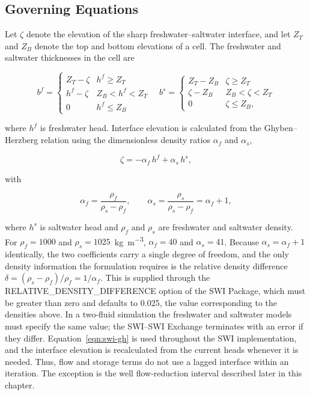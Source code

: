 \subsection{Governing Equations}

Let $\zeta$ denote the elevation of the sharp freshwater--saltwater interface, and let $Z_{T}$ and $Z_{B}$ denote the top and bottom elevations of a cell. The freshwater and saltwater thicknesses in the cell are

\begin{equation}
\label{eqn:swi-thick}
b^{f}=
\begin{cases}
Z_{T}-\zeta & h^{f}\ge Z_{T}\\
h^{f}-\zeta & Z_{B}<h^{f}<Z_{T}\\
0 & h^{f}\le Z_{B}
\end{cases}
\quad
b^{s}=
\begin{cases}
Z_{T}-Z_{B} & \zeta\ge Z_{T}\\
\zeta-Z_{B} & Z_{B}<\zeta<Z_{T}\\
0 & \zeta\le Z_{B},
\end{cases}
\end{equation}

\noindent where $h^{f}$ is freshwater head. Interface elevation is calculated from the Ghyben--Herzberg relation using the dimensionless density ratios $\alpha_{f}$ and $\alpha_{s}$,

\begin{equation}
\label{eqn:swi-gh}
\zeta = -\alpha_{f}\,h^{f} + \alpha_{s}\,h^{s},
\end{equation}

\noindent with

\begin{equation}
\label{eqn:swi-alpha}
\alpha_{f}=\frac{\rho_{f}}{\rho_{s}-\rho_{f}},
\qquad
\alpha_{s}=\frac{\rho_{s}}{\rho_{s}-\rho_{f}}=\alpha_{f}+1,
\end{equation}

\noindent where $h^{s}$ is saltwater head and $\rho_{f}$ and $\rho_{s}$ are freshwater and saltwater density. For $\rho_{f}=1000$ and $\rho_{s}=1025$~\si{\kilogram\per\cubic\meter}, $\alpha_{f}=40$ and $\alpha_{s}=41$. Because $\alpha_{s}=\alpha_{f}+1$ identically, the two coefficients carry a single degree of freedom, and the only density information the formulation requires is the relative density difference $\delta=(\rho_{s}-\rho_{f})/\rho_{f}=1/\alpha_{f}$. This is supplied through the RELATIVE\_DENSITY\_DIFFERENCE option of the SWI Package, which must be greater than zero and defaults to 0.025, the value corresponding to the densities above. In a two-fluid simulation the freshwater and saltwater models must specify the same value; the SWI--SWI Exchange terminates with an error if they differ. Equation~\ref{eqn:swi-gh} is used throughout the SWI implementation, and the interface elevation is recalculated from the current heads whenever it is needed. Thus, flow and storage terms do not use a lagged interface within an iteration. The exception is the well flow-reduction interval described later in this chapter.

